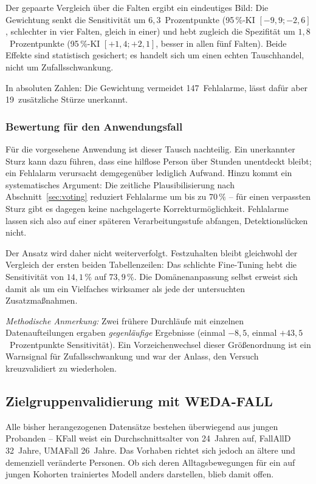 \documentclass[11pt,a4paper,oneside]{report}
\begin{document}
Der gepaarte Vergleich über die Falten ergibt ein eindeutiges Bild:
Die Gewichtung senkt die Sensitivität um $6{,}3$~Prozentpunkte
(95\,\%-KI $[-9{,}9; -2{,}6]$, schlechter in vier Falten, gleich in
einer) und hebt zugleich die Spezifität um $1{,}8$~Prozentpunkte
(95\,\%-KI $[+1{,}4; +2{,}1]$, besser in allen fünf Falten). Beide
Effekte sind statistisch gesichert; es handelt sich um einen echten
Tauschhandel, nicht um Zufallsschwankung.

In absoluten Zahlen: Die Gewichtung vermeidet 147~Fehlalarme, lässt
dafür aber 19~zusätzliche Stürze unerkannt.

\subsubsection{Bewertung für den Anwendungsfall}

Für die vorgesehene Anwendung ist dieser Tausch nachteilig. Ein
unerkannter Sturz kann dazu führen, dass eine hilflose Person über
Stunden unentdeckt bleibt; ein Fehlalarm verursacht demgegenüber
lediglich Aufwand. Hinzu kommt ein systematisches Argument: Die
zeitliche Plausibilisierung nach Abschnitt~\ref{sec:voting} reduziert
Fehlalarme um bis zu $70\,\%$ -- für einen verpassten Sturz gibt es
dagegen keine nachgelagerte Korrekturmöglichkeit. Fehlalarme lassen
sich also auf einer späteren Verarbeitungsstufe abfangen,
Detektionslücken nicht.

Der Ansatz wird daher nicht weiterverfolgt. Festzuhalten bleibt
gleichwohl der Vergleich der ersten beiden Tabellenzeilen: Das
schlichte Fine-Tuning hebt die Sensitivität von $14{,}1\,\%$ auf
$73{,}9\,\%$. Die Domänenanpassung selbst erweist sich damit als um
ein Vielfaches wirksamer als jede der untersuchten
Zusatzmaßnahmen.

\medskip
\noindent\textit{Methodische Anmerkung:} Zwei frühere Durchläufe mit
einzelnen Datenaufteilungen ergaben \emph{gegenläufige} Ergebnisse
(einmal $-8{,}5$, einmal $+43{,}5$~Prozentpunkte Sensitivität). Ein
Vorzeichenwechsel dieser Größenordnung ist ein Warnsignal für
Zufallsschwankung und war der Anlass, den Versuch kreuzvalidiert zu
wiederholen.

\subsection{Zielgruppenvalidierung mit WEDA-FALL}
\label{sec:zielgruppe}

Alle bisher herangezogenen Datensätze bestehen überwiegend aus jungen
Probanden -- KFall weist ein Durchschnittsalter von 24~Jahren auf,
FallAllD 32~Jahre, UMAFall 26~Jahre. Das Vorhaben richtet sich
jedoch an ältere und demenziell veränderte Personen. Ob sich deren
Alltagsbewegungen für ein auf jungen Kohorten trainiertes Modell
anders darstellen, blieb damit offen.
\end{document}
